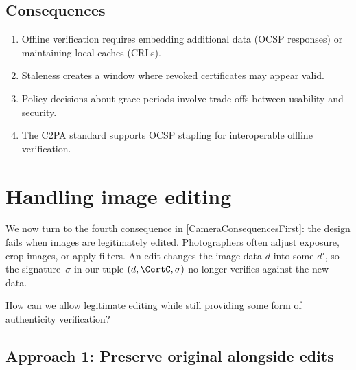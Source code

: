 \subsection{Consequences}

\begin{enumerate}
  \item Offline verification requires embedding additional data (OCSP responses)
    or maintaining local caches (CRLs).
  \item Staleness creates a window where revoked certificates may appear valid.
  \item Policy decisions about grace periods involve trade-offs between
    usability and security.
  \item The C2PA standard supports OCSP stapling for interoperable offline
    verification.
\end{enumerate}


\section{Handling image editing}\label{CameraEditing}


We now turn to the fourth consequence in \cref{CameraConsequencesFirst}:
the design fails when images are legitimately edited.
Photographers often adjust exposure, crop images, or apply filters.
An edit changes the image data \(d\) into some \(d'\), so the
signature~\(\sigma\) in our tuple \((d, \CertC, \sigma)\) no longer
verifies against the new data.

\begin{exercise}
  How can we allow legitimate editing while still providing some form of
  authenticity verification?
\end{exercise}

\subsection{Approach 1: Preserve original alongside edits}

